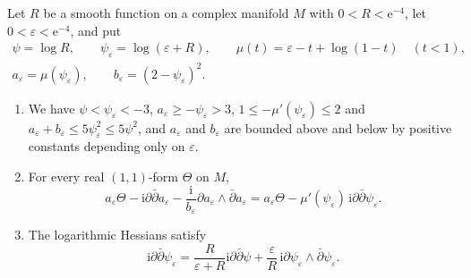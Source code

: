 \begin{lemma}\label{lem:critical-twist-functions}
Let $R$ be a smooth function on a complex manifold $M$ with $0<R<\mathrm e^{-4}$, let $0<\varepsilon<\mathrm e^{-4}$, and put
\[
 \begin{gathered}
 \psi=\log R,\qquad\psi_\varepsilon=\log(\varepsilon+R),\qquad\mu(t)=\varepsilon-t+\log(1-t)\quad(t<1),\\
 a_\varepsilon=\mu(\psi_\varepsilon),\qquad b_\varepsilon=(2-\psi_\varepsilon)^2.
 \end{gathered}
\]
\begin{enumerate}
\item We have $\psi<\psi_\varepsilon<-3$, $a_\varepsilon\geq-\psi_\varepsilon>3$, $1\leq-\mu'(\psi_\varepsilon)\leq2$ and $a_\varepsilon+b_\varepsilon\leq5\psi_\varepsilon^2\leq5\psi^2$, and $a_\varepsilon$ and $b_\varepsilon$ are bounded above and below by positive constants depending only on $\varepsilon$.
\item For every real $(1,1)$-form $\Theta$ on $M$,
\[
 a_\varepsilon\Theta-\mathrm i\partial\bar\partial a_\varepsilon-\frac{\mathrm i}{b_\varepsilon}\partial a_\varepsilon\wedge\bar\partial a_\varepsilon
 =a_\varepsilon\Theta-\mu'(\psi_\varepsilon)\,\mathrm i\partial\bar\partial\psi_\varepsilon.
\]
\item The logarithmic Hessians satisfy
\begin{equation}\label{eq:logarithmic-normal-hessian}
 \mathrm i\partial\bar\partial\psi_\varepsilon
   =\frac{R}{\varepsilon+R}\mathrm i\partial\bar\partial\psi
       +\frac{\varepsilon}{R}\,
                    \mathrm i\partial\psi_\varepsilon\wedge\bar\partial\psi_\varepsilon.
\end{equation}
\end{enumerate}
\end{lemma}
